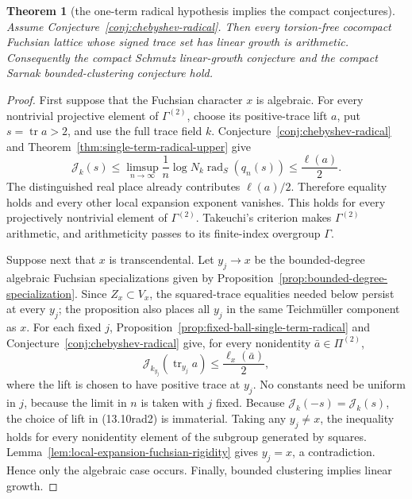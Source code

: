 \documentclass[11pt,reqno]{amsart}
\newtheorem{theorem}{Theorem}[section]
\theoremstyle{definition}
\theoremstyle{remark}
\newcommand{\Tr}{\operatorname{tr}}
\begin{document}
\begin{theorem}[the one-term radical hypothesis implies the compact conjectures]
\label{thm:chebyshev-radical-implies-compact}
Assume Conjecture~\ref{conj:chebyshev-radical}.  Then every torsion-free
cocompact Fuchsian lattice whose signed trace set has linear growth is
arithmetic.  Consequently the compact Schmutz linear-growth conjecture and
the compact Sarnak bounded-clustering conjecture hold.
\end{theorem}

\begin{proof}
First suppose that the Fuchsian character \(x\) is algebraic.  For every
nontrivial projective element of \(\Gamma^{(2)}\), choose its
positive-trace lift \(a\), put \(s=\Tr a>2\), and use the full trace field
\(k\).  Conjecture~\ref{conj:chebyshev-radical} and
Theorem~\ref{thm:single-term-radical-upper} give
\[
 \mathcal J_k(s)
 \le
 \limsup_{n\to\infty}\frac1n
 \log N_k\operatorname{rad}_S(q_n(s))
 \le\frac{\ell(a)}2.
\tag{13.10rad1}
\]
The distinguished real place already contributes \(\ell(a)/2\).
Therefore equality holds and every other local expansion exponent
vanishes.  This holds for every projectively nontrivial element of
\(\Gamma^{(2)}\).  Takeuchi's criterion \cite{Takeuchi} makes
\(\Gamma^{(2)}\) arithmetic, and arithmeticity passes to its finite-index
overgroup \(\Gamma\).

Suppose next that \(x\) is transcendental.  Let \(y_j\to x\) be the
bounded-degree algebraic Fuchsian specializations given by
Proposition~\ref{prop:bounded-degree-specialization}.  Since
\(Z_x\subset V_x\), the squared-trace equalities needed below persist at
every \(y_j\); the proposition also places all \(y_j\) in the same
Teichm\"uller component as \(x\).  For each fixed
\(j\), Proposition~\ref{prop:fixed-ball-single-term-radical} and
Conjecture~\ref{conj:chebyshev-radical} give, for every nonidentity
\(\bar a\in\Pi^{(2)}\),
\[
 \mathcal J_{k_{y_j}}(\Tr_{y_j}a)
 \le\frac{\ell_x(\bar a)}2,
\tag{13.10rad2}
\]
where the lift is chosen to have positive trace at \(y_j\).  No constants
need be uniform in \(j\), because the limit in \(n\) is taken with \(j\)
fixed.
Because \(\mathcal J_k(-s)=\mathcal J_k(s)\), the choice of lift in
(13.10rad2) is immaterial.  Taking any \(y_j\ne x\), the inequality holds
for every nonidentity element of the subgroup generated by squares.
Lemma~\ref{lem:local-expansion-fuchsian-rigidity} gives \(y_j=x\), a
contradiction.  Hence only the algebraic case occurs.  Finally, bounded
clustering implies linear growth.
\end{proof}
\end{document}
